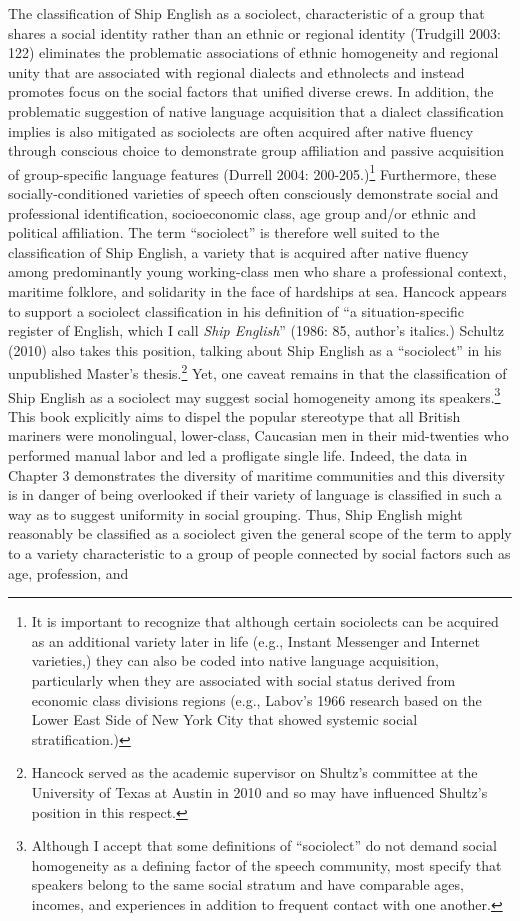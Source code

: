 \begin{styleStandard}
The classification of Ship English as a sociolect, characteristic of a group that shares a social identity rather than an ethnic or regional identity (Trudgill 2003: 122) eliminates the problematic associations of ethnic homogeneity and regional unity that are associated with regional dialects and ethnolects and instead promotes focus on the social factors that unified diverse crews. In addition, the problematic suggestion of native language acquisition that a dialect classification implies is also mitigated as sociolects are often acquired after native fluency through conscious choice to demonstrate group affiliation and passive acquisition of group-specific language features (Durrell 2004: 200-205.)\footnote{ It is important to recognize that although certain sociolects can be acquired as an additional variety later in life (e.g., Instant Messenger and Internet varieties,) they can also be coded into native language acquisition, particularly when they are associated with social status derived from economic class divisions regions (e.g., Labov’s 1966 research based on the Lower East Side of New York City that showed systemic social stratification.) } Furthermore, these socially-conditioned varieties of speech often consciously demonstrate social and professional identification, socioeconomic class, age group and/or ethnic and political affiliation. The term “sociolect” is therefore well suited to the classification of Ship English, a variety that is acquired after native fluency among predominantly young working-class men who share a professional context, maritime folklore, and solidarity in the face of hardships at sea. Hancock appears to support a sociolect classification in his definition of “a situation-specific register of English, which I call \textit{Ship English}” (1986: 85, author’s italics.) Schultz (2010) also takes this position, talking about Ship English as a “sociolect” in his unpublished Master’s thesis.\footnote{ Hancock served as the academic supervisor on Shultz’s committee at the University of Texas at Austin in 2010 and so may have influenced Shultz’s position in this respect. } Yet, one caveat remains in that the classification of Ship English as a sociolect may suggest social homogeneity among its speakers.\footnote{ Although I accept that some definitions of “sociolect” do not demand social homogeneity as a defining factor of the speech community, most specify that speakers belong to the same social stratum and have comparable ages, incomes, and experiences in addition to frequent contact with one another. } This book explicitly aims to dispel the popular stereotype that all British mariners were monolingual, lower-class, Caucasian men in their mid-twenties who performed manual labor and led a profligate single life. Indeed, the data in Chapter 3 demonstrates the diversity of maritime communities and this diversity is in danger of being overlooked if their variety of language is classified in such a way as to suggest uniformity in social grouping. Thus, Ship English might reasonably be classified as a sociolect given the general scope of the term to apply to a variety characteristic to a group of people connected by social factors such as age, profession, and 
\end{styleStandard}
